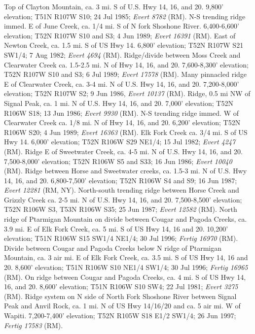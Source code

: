 Top of Clayton Mountain, ca. 3 mi. S of U.S. Hwy 14, 16, and 20. 9,800’
elevation; T51N R107W S10; 24 Jul 1985; \textit{Evert 8782} (RM).
N-S trending ridge immed. E of June Creek, ca. 1/4 mi. S of N fork Shoshone
River. 6,400-6,600’ elevation; T52N R107W S10 and S3; 4 Jun 1989;
\textit{Evert 16391} (RM).
East of Newton Creek, ca. 1.5 mi. S of US Hwy 14. 6,800’ elevation; T52N R107W
S21 SW1/4; 7 Aug 1982; \textit{Evert 4694} (RM).
Ridge/divide between Moss Creek and Clearwater Creek ca. 1.5-2.5 mi. N of Hwy
14, 16, and 20. 7,600-8,300’ elevation; T52N R107W S10 and S3; 6 Jul 1989;
\textit{Evert 17578} (RM).
Many pinnacled ridge E of Clearwater Creek, ca. 3-4 mi. N of U.S. Hwy 14, 16,
and 20. 7,200-8,000’ elevation; T52N R107W S2; 9 Jun 1986,
\textit{Evert 10137} (RM).
Ridge, 0.5 mi NW of Signal Peak, ca. 1 mi. N of U.S. Hwy 14, 16, and 20. 7,000’
elevation; T52N R106W S18; 13 Jun 1986; \textit{Evert 9930} (RM).
N-S trending ridge immed. W of Clearwater Creek ca. 1/8 mi. N of Hwy 14, 16,
and 20. 6,200’ elevation; T52N R106W S20; 4 Jun 1989; \textit{Evert 16363} (RM).
Elk Fork Creek ca. 3/4 mi. S of US Hwy 14. 6,000’ elevation; T52N R106W S29
NE1/4; 15 Jul 1982; \textit{Evert 4247} (RM).
Ridge E of Sweetwater Creek, ca. 4-5 mi. N of U.S. Hwy 14, 16, and 20.
7,500-8,000’ elevation;  T52N R106W S5 and S33; 16 Jun 1986;
\textit{Evert 10040} (RM).
Ridge between Horse and Sweetwater creeks, ca. 1.5-3 mi. N of U.S. Hwy 14, 16,
and 20. 6,800-7,500’ elevation; T52N R106W S4 and S9; 16 Jun 1987;
\textit{Evert 12281} (RM, NY).
North-south trending ridge between Horse Creek and Grizzly Creek ca. 2-5 mi. N
of U.S. Hwy 14, 16, and 20. 7,500-8,500’ elevation; T52N R106W S3, T53N R106W
S35; 25 Jun 1987; \textit{Evert 12582} (RM).
North ridge of Ptarmigan Mountain on divide between Cougar and Pagoda Creeks,
ca. 3.9 mi. E of Elk Fork Creek, ca. 5 mi. S of US Hwy 14, 16 and 20. 10,200’
elevation; T51N R106W S15 SW1/4 NE1/4; 30 Jul 1996; \textit{Fertig 16970} (RM).
Divide between Cougar and Pagoda Creeks below N ridge of Ptarmigan Mountain,
ca. 3 air mi. E of Elk Fork Creek, ca. 3.5 mi. S of US Hwy 14, 16 and 20.
8,600’ elevation; T51N R106W S10 NE1/4 SW1/4; 30 Jul 1996;
\textit{Fertig 16965} (RM).
On ridge between Cougar and Pagoda Creeks, ca. 4 mi. S of US Hwy 14, 16, and 20.
8,600’ elevation; T51N R106W S10 SW4; 22 Jul 1981; \textit{Evert 3275} (RM).
Ridge system on N side of North Fork Shoshone River between Signal Peak and
Anvil Rock, ca. 1 mi. N of US Hwy 14/16/20 and ca. 5 air mi. W of Wapiti.
7,200-7,400’ elevation; T52N R105W S18 E1/2 SW1/4; 26 Jun 1997;
\textit{Fertig 17583} (RM).
